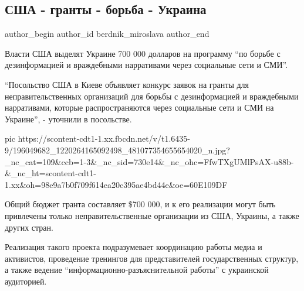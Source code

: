  
 
 
 
 
 
\subsection{США - гранты - борьба - Украина}
\label{sec:05_06_2021.fb.berdnik_miroslava.1.granty_usa_ukraina}
\ifcmt
 author_begin
   author_id berdnik_miroslava
 author_end
\fi

Власти США выделят Украине 700 000 долларов на программу \enquote{по борьбе с дезинформацией и враждебными нарративами через социальные сети и СМИ}.

\enquote{Посольство США в Киеве объявляет конкурс заявок на гранты для
неправительственных организаций для борьбы с дезинформацией и враждебными
нарративами, которые распространяются через социальные сети и СМИ на Украине},
- уточнили в посольстве.

\ifcmt
  pic https://scontent-cdt1-1.xx.fbcdn.net/v/t1.6435-9/196049682_1220264165092498_481077354655654020_n.jpg?_nc_cat=109&ccb=1-3&_nc_sid=730e14&_nc_ohc=FfwTXgUMlPsAX-u88b-&_nc_ht=scontent-cdt1-1.xx&oh=98e9a7b0f709f614ea20c395ae4bd44e&oe=60E109DF
\fi

Общий бюджет гранта составляет \$700 000, и к его реализации могут быть
привлечены только неправительственные организации из США, Украины, а также
других стран.

Реализация такого проекта подразумевает координацию работы медиа и активистов,
проведение тренингов для представителей государственных структур, а также
ведение \enquote{информационно-разъяснительной работы} с украинской аудиторией.

